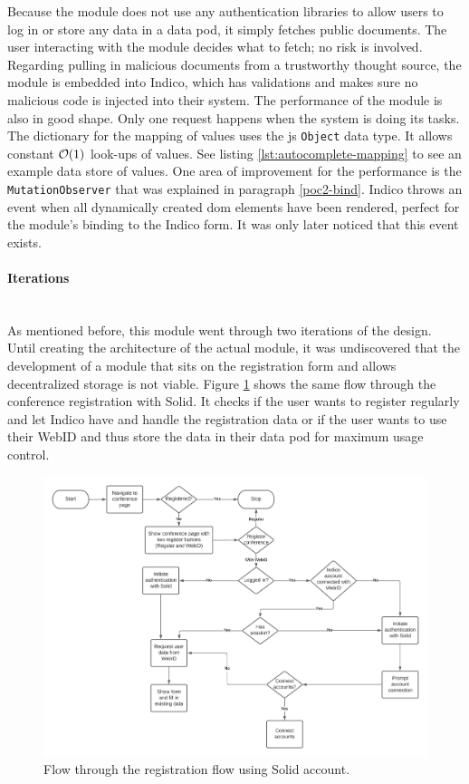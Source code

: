 Because the module does not use any authentication libraries to allow users to log in or store any data in a data pod, it simply fetches public documents. The user interacting with the module decides what to fetch; no risk is involved. Regarding pulling in malicious documents from a trustworthy thought source, the module is embedded into Indico, which has validations and makes sure no malicious code is injected into their system.
The performance of the module is also in good shape. Only one request happens when the system is doing its tasks. The dictionary for the mapping of values uses the \gls{js} \texttt{Object} data type. It allows constant $\mathcal{O}(1)$ look-ups of values. See listing \ref{lst:autocomplete-mapping} to see an example data store of values. One area of improvement for the performance is the \texttt{MutationObserver} that was explained in paragraph \ref{poc2-bind}. Indico throws an event when all dynamically created \gls{dom} elements have been rendered, perfect for the module's binding to the Indico form. It was only later noticed that this event exists.
\vspace{0.5cm}
\paragraph{Iterations}\mbox{}\\

As mentioned before, this module went through two iterations of the design. Until creating the architecture of the actual module, it was undiscovered that the development of a module that sits on the registration form and allows decentralized storage is not viable. Figure \ref{fig:poc-conference_registration_flow-sideways} shows the same flow through the conference registration with Solid. It checks if the user wants to register regularly and let Indico have and handle the registration data or if the user wants to use their WebID and thus store the data in their data pod for maximum usage control.

\begin{figure}[H]
    \centering
    \includegraphics[width=1\textwidth]{prototype/graphs/poc-conference_registration_flow-sideways.jpeg}
    \caption{Flow through the registration flow using Solid account.}
    \label{fig:poc-conference_registration_flow-sideways}
\end{figure}

